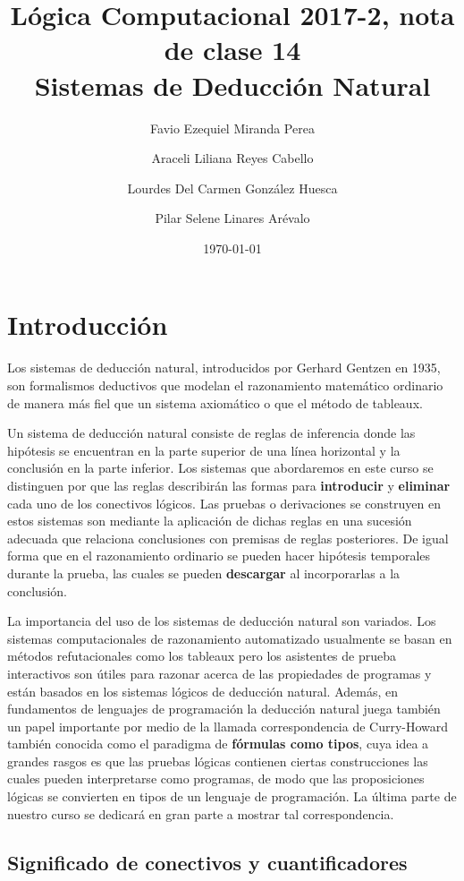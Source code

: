 \documentclass[11pt,letterpaper]{article}
\title{Lógica Computacional 2017-2, nota de clase 14\\
Sistemas de Deducción Natural
}
\author{Favio Ezequiel Miranda Perea \and Araceli Liliana Reyes Cabello\and
Lourdes Del Carmen Gonz\'alez Huesca \and Pilar Selene Linares Arévalo}
\date{\today}
\begin{document}
\maketitle

\section{Introducción}

Los sistemas de deducción natural, introducidos por Gerhard Gentzen en 1935, son
formalismos deductivos que modelan el razonamiento matemático ordinario de
manera más fiel que un sistema axiomático o que el método de tableaux.  

Un sistema de deducción natural consiste de reglas de inferencia donde las 
hip\'otesis se encuentran en la parte superior de una l\'inea horizontal y la 
conclusión en la parte inferior.
Los sistemas que abordaremos en este curso se distinguen por que las reglas 
describir\'an las formas para \textbf{introducir} y \textbf{eliminar} cada uno 
de los conectivos lógicos. 
Las pruebas o derivaciones se construyen en estos sistemas son mediante la 
aplicación de dichas reglas en una sucesión adecuada que relaciona conclusiones 
con premisas de reglas posteriores. De igual forma que en el razonamiento 
ordinario se pueden hacer hipótesis temporales durante la prueba, las cuales se 
pueden \textbf{descargar} al incorporarlas a la conclusión. 


La importancia del uso de los sistemas de deducción natural son variados. 
Los sistemas computacionales de razonamiento automatizado usualmente se basan 
en métodos refutacionales como los tableaux pero los asistentes de prueba 
interactivos son útiles para razonar acerca de las propiedades de programas y 
est\'an basados en los sistemas lógicos de deducción natural.
Adem\'as, en fundamentos de lenguajes de programación la deducción natural 
juega también un papel importante por medio de la llamada correspondencia de 
Curry-Howard también conocida como el paradigma de \textbf{fórmulas como tipos}, 
cuya idea a grandes rasgos es que las pruebas lógicas contienen ciertas 
construcciones las cuales pueden interpretarse como programas, de modo que las 
proposiciones lógicas se convierten en tipos de un lenguaje de programación. La 
última parte de nuestro curso se dedicará en gran parte a mostrar tal 
correspondencia.


\subsection{Significado de conectivos y cuantificadores}
\end{document}

